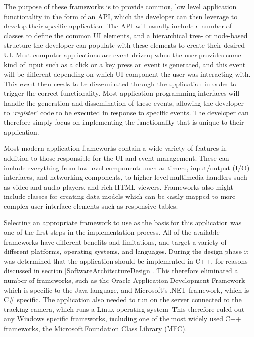 The purpose of these frameworks is to provide common, low level application functionality in the form of an API, which the developer can then leverage to develop their specific application. The API will usually include a number of classes to define the common UI elements, and a hierarchical tree- or node-based structure the developer can populate with these elements to create their desired UI. Most computer applications are event driven; when the user provides some kind of input such as a click or a key press an event is generated, and this event will be different depending on which UI component the user was interacting with. This event then needs to be disseminated through the application in order to trigger the correct functionality. Most application programming interfaces will handle the generation and dissemination of these events, allowing the developer to `\textit{register}' code to be executed in response to specific events. The developer can therefore simply focus on implementing the functionality that is unique to their application.

Most modern application frameworks contain a wide variety of features in addition to those responsible for the UI and event management. These can include everything from low level components such as timers, input/output (I/O) interfaces, and networking components, to higher level multimedia handlers such as video and audio players, and rich HTML viewers. Frameworks also might include classes for creating data models which can be easily mapped to more complex user interface elements such as responsive tables.

Selecting an appropriate framework to use as the basis for this application was one of the first steps in the implementation process. All of the available frameworks have different benefits and limitations, and target a variety of different platforms, operating systems, and languages. During the design phase it was determined that the application should be implemented in C++, for reasons discussed in section \ref{SoftwareArchitectureDesign}. This therefore eliminated a number of frameworks, such as the Oracle Application Development Framework which is specific to the Java language, and Microsoft's .NET framework, which is C\# specific. The application also needed to run on the server connected to the tracking camera, which runs a Linux operating system. This therefore ruled out any Windows specific frameworks, including one of the most widely used C++ frameworks, the Microsoft Foundation Class Library (MFC).


